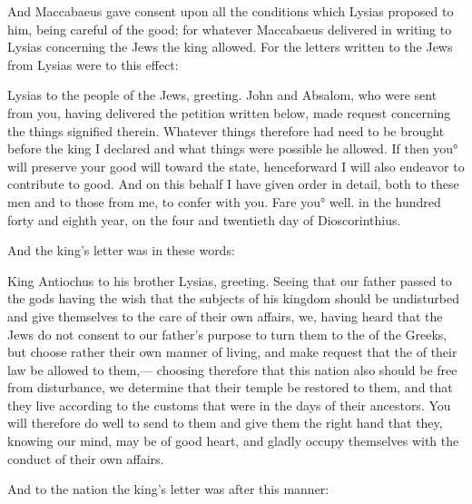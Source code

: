 {And Maccabaeus gave consent upon all the conditions which Lysias proposed to him, being careful of the
{} good; for whatever
{} Maccabaeus delivered in writing to Lysias concerning the Jews the king allowed.
For the letters written to the Jews from Lysias were to this effect:
\par }{\PP Lysias to the
 people of the Jews, greeting.
John and Absalom, who were sent from you, having delivered the
 petition written below, made request concerning the things signified therein.
Whatever things therefore had need to be brought before the king I declared
{} and what things were possible he allowed.
If then you° will preserve your good will toward the state, henceforward I will also endeavor to contribute to
{} good.
 And on this behalf I have given order in detail, both to these men and to those
{} from me, to confer with you.
Fare you° well.
{} in the hundred forty and eighth year, on the four and twentieth day of
{}
 Dioscorinthius.
\par }{\PP {}And the king’s letter was in these words:
\par }{\PP King Antiochus to his brother Lysias, greeting.
Seeing that our father passed to the gods having the wish that the subjects of his kingdom
 should be undisturbed and give themselves to the care of their own affairs,
we, having heard that the Jews do not consent to our father’s purpose to turn them to the
{} of the Greeks, but choose rather their own manner of living, and make request that the
{} of their law be allowed to them,—
choosing therefore that this nation also should be free from
 disturbance, we determine that their temple be restored to them, and that they live according to the customs that were in the days of their ancestors.
You will therefore do well to send
{} to them and give them the right hand
{} that they, knowing our mind, may be of good heart, and gladly occupy themselves with the conduct of their own affairs.
\par }{\PP {}And to the nation the king’s letter was after this manner:
}
